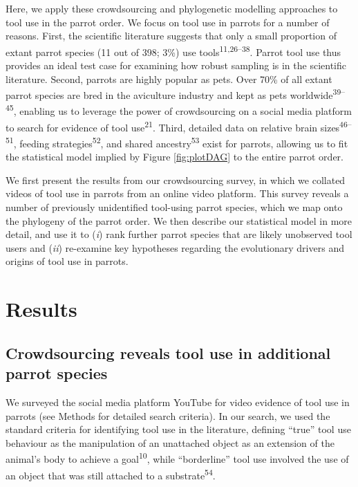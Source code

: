\documentclass[
  man,floatsintext]{apa6}
\begin{document}
Here, we apply these crowdsourcing and phylogenetic modelling approaches to tool
use in the parrot order. We focus on tool use in parrots for a number of
reasons. First, the scientific literature suggests that only a small proportion
of extant parrot species (11 out of 398; 3\%) use tools\textsuperscript{11,26--38}. Parrot tool use
thus provides an ideal test case for examining how robust sampling is in the
scientific literature. Second, parrots are highly popular as pets. Over 70\% of
all extant parrot species are bred in the aviculture industry and kept as pets
worldwide\textsuperscript{39--45}, enabling us to leverage the power of crowdsourcing on a social
media platform to search for evidence of tool use\textsuperscript{21}. Third, detailed
data on relative brain sizes\textsuperscript{46--51}, feeding strategies\textsuperscript{52}, and
shared ancestry\textsuperscript{53} exist for parrots, allowing us to fit the
statistical model implied by Figure \ref{fig:plotDAG} to the entire parrot
order.

We first present the results from our crowdsourcing survey, in which we collated
videos of tool use in parrots from an online video platform. This survey reveals
a number of previously unidentified tool-using parrot species, which we map onto
the phylogeny of the parrot order. We then describe our statistical model in
more detail, and use it to (\emph{i}) rank further parrot species that are likely
unobserved tool users and (\emph{ii}) re-examine key hypotheses regarding the
evolutionary drivers and origins of tool use in parrots.

\hypertarget{results}{%
\section{Results}\label{results}}

\hypertarget{crowdsourcing-reveals-tool-use-in-additional-parrot-species}{%
\subsection{Crowdsourcing reveals tool use in additional parrot species}\label{crowdsourcing-reveals-tool-use-in-additional-parrot-species}}

We surveyed the social media platform YouTube for video evidence of tool use in
parrots (see Methods for detailed search criteria). In our search, we used the
standard criteria for identifying tool use in the literature, defining ``true''
tool use behaviour as the manipulation of an unattached object as an extension
of the animal's body to achieve a goal\textsuperscript{10}, while ``borderline'' tool
use involved the use of an object that was still attached to a substrate\textsuperscript{54}.
\end{document}

